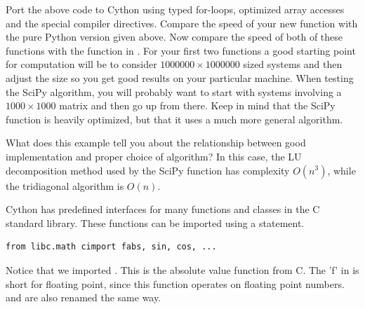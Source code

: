 \begin{problem}
Port the above code to Cython using typed for-loops, optimized array accesses and the special compiler directives.
Compare the speed of your new function with the pure Python version given above.
Now compare the speed of both of these functions with the  function in .
For your first two functions a good starting point for computation will be to consider $1000000 \times 1000000$ sized systems and then adjust the size so you get good results on your particular machine.
When testing the SciPy algorithm, you will probably want to start with systems involving a $1000 \times 1000$ matrix and then go up from there.
Keep in mind that the SciPy function is heavily optimized, but that it uses a much more general algorithm.

What does this example tell you about the relationship between good implementation and proper choice of algorithm?
In this case, the LU decomposition method used by the SciPy function has complexity $O(n^3)$, while the tridiagonal algorithm is $O(n)$.
\end{problem}

\begin{info}
Cython has predefined interfaces for many functions and classes in the C standard library.
These functions can be imported using a  statement.
\begin{lstlisting}
from libc.math cimport fabs, sin, cos, ...
\end{lstlisting}
Notice that we imported .
This is the absolute value function from C.
The 'f' in  is short for floating point, since this function operates on floating point numbers.
 and  are also renamed the same way.
\end{info}